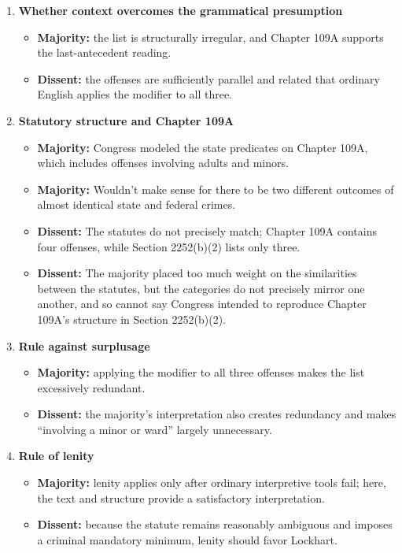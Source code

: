 \documentclass[11pt]{tex/lawoutline}
\begin{document}
{\begin{enumerate}
    \item \textbf{Whether context overcomes the grammatical presumption}
    \begin{itemize}
        \item \textbf{Majority:} the list is structurally irregular, and Chapter 109A supports the last-antecedent reading.
        \item \textbf{Dissent:} the offenses are sufficiently parallel and related that ordinary English applies the modifier to all three.
    \end{itemize}

    \item \textbf{Statutory structure and Chapter 109A}
    \begin{itemize}
        \item \textbf{Majority:} Congress modeled the state predicates on Chapter 109A, which includes offenses involving adults and minors.
        \item \textbf{Majority:} Wouldn't make sense for there to be two different outcomes of almost identical state and federal crimes. 
        \item \textbf{Dissent:} The statutes do not precisely match; Chapter 109A contains four offenses, while Section 2252(b)(2) lists only three.
        \item \textbf{Dissent:} The majority placed too much weight on the similarities between the statutes, but the categories do not precisely mirror one another, and so cannot say Congress intended to reproduce Chapter 109A's structure in Section 2252(b)(2).
    \end{itemize}

    \item \textbf{Rule against surplusage}
    \begin{itemize}
        \item \textbf{Majority:} applying the modifier to all three offenses makes the list excessively redundant.
        \item \textbf{Dissent:} the majority's interpretation also creates redundancy and makes ``involving a minor or ward'' largely unnecessary.
    \end{itemize}

    \item \textbf{Rule of lenity}
    \begin{itemize}
        \item \textbf{Majority:} lenity applies only after ordinary interpretive tools fail; here, the text and structure provide a satisfactory interpretation.
        \item \textbf{Dissent:} because the statute remains reasonably ambiguous and imposes a criminal mandatory minimum, lenity should favor Lockhart.
    \end{itemize}
\end{enumerate}
}
\end{document}
